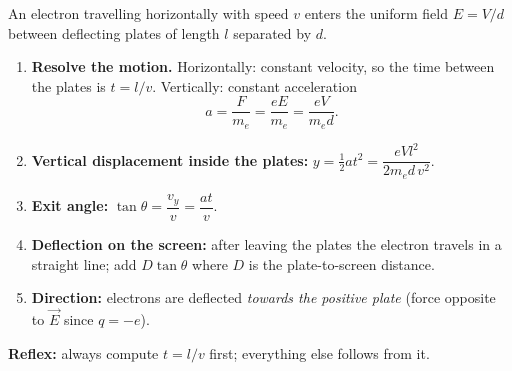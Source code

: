 \documentclass[11pt]{article}
\begin{document}
\begin{methode}
An electron travelling horizontally with speed $v$ enters the uniform field $E = V/d$ between deflecting plates of length $l$ separated by $d$.
\begin{enumerate}
\item \textbf{Resolve the motion.} Horizontally: constant velocity, so the time between the plates is $t = l/v$. Vertically: constant acceleration
\[ a = \dfrac{F}{m_e} = \dfrac{eE}{m_e} = \dfrac{eV}{m_e d}. \]
\item \textbf{Vertical displacement inside the plates:} $y = \tfrac{1}{2}at^2 = \dfrac{eVl^2}{2m_e d\, v^2}$.
\item \textbf{Exit angle:} $\tan\theta = \dfrac{v_y}{v} = \dfrac{at}{v}$.
\item \textbf{Deflection on the screen:} after leaving the plates the electron travels in a straight line; add $D\tan\theta$ where $D$ is the plate-to-screen distance.
\item \textbf{Direction:} electrons are deflected \emph{towards the positive plate} (force opposite to $\vec{E}$ since $q=-e$).
\end{enumerate}
\textbf{Reflex:} always compute $t = l/v$ first; everything else follows from it.
\end{methode}
\end{document}
